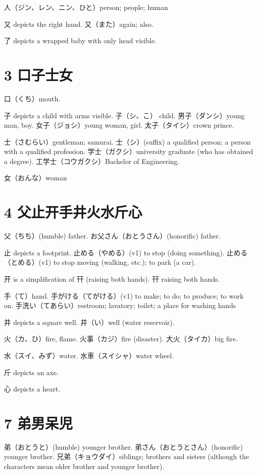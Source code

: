 人（ジン、レン、ニン、ひと）person; people; human

又 depicts the right hand.
又（また）again; also.

了 depicts a wrapped baby with only head visible.

\section{3 口子士女}

口（くち）mouth.

子 depicts a child with arms visible.
子（シ、こ） child.
男子（ダンシ）young man, boy.
女子（ジョシ）young woman, girl.
太子（タイシ）crown prince.

士（さむらい）gentleman; samurai.
士（シ）(suffix)
a qualified person;
a person with a qualified profession.
学士（ガクシ）university graduate (who has obtained a degree).
工学士（コウガクシ）Bachelor of Engineering.

女（おんな）woman

\section{4 父止开手井火水斤心}

父（ちち）(humble) father.
お父さん（おとうさん）(honorific) father.

止 depicts a footprint.
止める（やめる）(v1) to stop (doing something).
止める（とめる）(v1) to stop moving (walking, etc.); to park (a car).

开 is a simplification of 幵 (raising both hands).
幵 raising both hands.

手（て）hand.
手がける（てがける）(v1) to make; to do; to produce; to work on.
手洗い（てあらい）restroom; lavatory; toilet; a place for washing hands

井 depicts a square well.
井（い）well (water reservoir).

火（カ、ひ）fire, flame.
火事（カジ）fire (disaster).
大火（タイカ）big fire.

水（スイ、みず）water.
水車（スイシャ）water wheel.

斤 depicts an axe.

心 depicts a heart.

\section{7 弟男呆児}

弟（おとうと）(humble) younger brother.
弟さん（おとうとさん）(honorific) younger brother.
兄弟（キョウダイ）siblings;
brothers and sisters
(although the characters mean older brother and younger brother).

